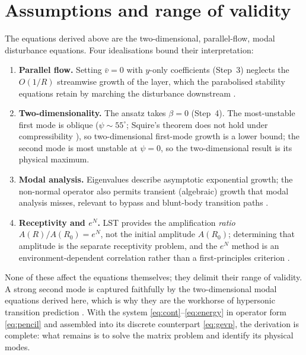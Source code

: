 \documentclass[11pt]{article}
\begin{document}
\section{Assumptions and range of validity}\label{sec:scope}
The equations derived above are the two-dimensional, parallel-flow, modal disturbance equations. Four
idealisations bound their interpretation:
\begin{enumerate}[nosep,leftmargin=1.9em]
  \item \textbf{Parallel flow.} Setting $\bar v=0$ with $y$-only coefficients (Step~3) neglects the
        $O(1/R)$ streamwise growth of the layer, which the parabolised stability equations retain by
        marching the disturbance downstream \cite{herbert1997}.
  \item \textbf{Two-dimensionality.} The ansatz takes $\beta=0$ (Step~4). The most-unstable first mode
        is oblique ($\psi\sim55^\circ$; Squire's theorem does not hold under compressibility
        \cite{mack1984}), so two-dimensional first-mode growth is a lower bound; the second mode is
        most unstable at $\psi=0$, so the two-dimensional result is its physical maximum.
  \item \textbf{Modal analysis.} Eigenvalues describe asymptotic exponential growth; the non-normal
        operator also permits transient (algebraic) growth that modal analysis misses, relevant to
        bypass and blunt-body transition paths \cite{schmid2001}.
  \item \textbf{Receptivity and $e^N$.} LST provides the amplification \emph{ratio}
        $A(R)/A(R_0)=e^N$, not the initial amplitude $A(R_0)$; determining that amplitude is the
        separate receptivity problem, and the $e^N$ method is an environment-dependent correlation
        rather than a first-principles criterion \cite{vaningen1956,fedorov2011}.
\end{enumerate}
None of these affect the equations themselves; they delimit their range of validity. A strong second
mode is captured faithfully by the two-dimensional modal equations derived here, which is why they are
the workhorse of hypersonic transition prediction \cite{mack1984,fedorov2011}. With the system
\eqref{eq:cont}--\eqref{eq:energy} in operator form \eqref{eq:pencil} and assembled into its
discrete counterpart \eqref{eq:gevp}, the derivation is complete: what remains is to solve the matrix
problem and identify its physical modes.
\end{document}
